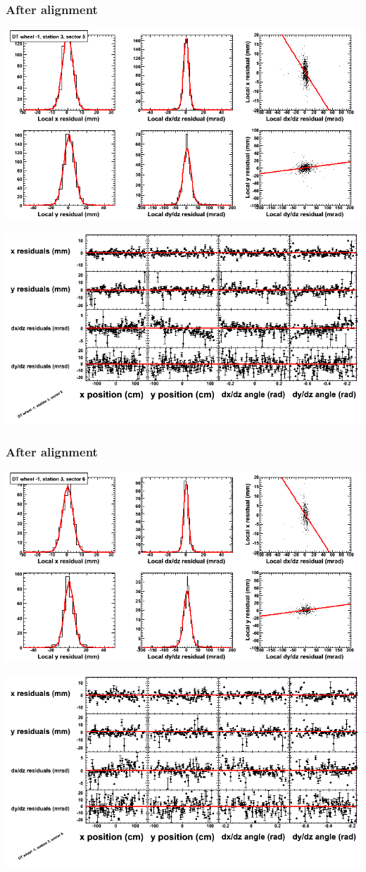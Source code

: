 \documentclass[compress]{beamer}
\begin{document}
\begin{frame}
\frametitle{After alignment}
\includegraphics[width=0.7\linewidth]{NOV4_fitfunctions/MBwhBst3sec05_bellcurves.png}

\includegraphics[width=0.7\linewidth]{NOV4_fitfunctions/MBwhBst3sec05_polynomials.png}
\end{frame}

\begin{frame}
\frametitle{After alignment}
\includegraphics[width=0.7\linewidth]{NOV4_fitfunctions/MBwhBst3sec06_bellcurves.png}

\includegraphics[width=0.7\linewidth]{NOV4_fitfunctions/MBwhBst3sec06_polynomials.png}
\end{frame}
\end{document}
